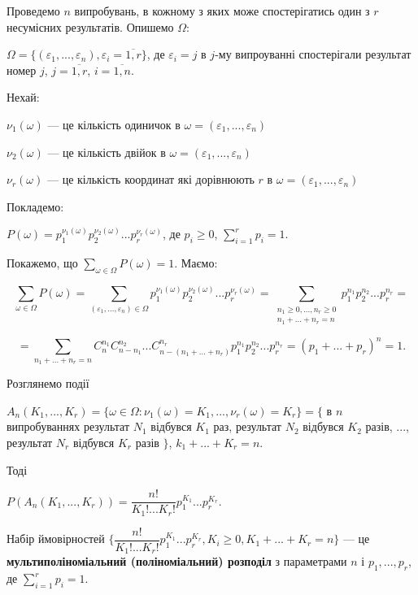 Проведемо $n$ випробувань, в кожному з яких може спостерігатись один з $r$ несумісних 
результатів. Опишемо $\Omega:$

$\Omega = \{(\varepsilon_1, ..., \varepsilon_n), \varepsilon_i = \overline{1,r}\}$,
де $\varepsilon_i = j$ в $j$-му випроуванні спостерігали результат номер $j$,
$j = \overline{1,r}$, $i = \overline{1, n}$.

Нехай:

$\nu_1(\omega)$ --- це кількість одиничок в $\omega = (\varepsilon_1, ..., \varepsilon_n)$

$\nu_2(\omega)$ --- це кількість двійок в $\omega = (\varepsilon_1, ..., \varepsilon_n)$

$\nu_r(\omega)$ --- це кількість координат які дорівнюють $r$ в $\omega = (\varepsilon_1, ..., \varepsilon_n)$

Покладемо: 

$P(\omega) = p_1^{\nu_1(\omega)}p_2^{\nu_2(\omega)}...p_r^{\nu_r(\omega)}$, де $p_i \geqslant 0$,
$\sum\limits_{i=1}^r p_i = 1$.

Покажемо, що $\sum\limits_{\omega \in \Omega} P(\omega) = 1$. Маємо: 

$$\sum\limits_{\omega \in \Omega} P(\omega)
= \sum\limits_{(\varepsilon_1, ..., \varepsilon_n) \in \Omega}
    p_1^{\nu_1(\omega)}p_2^{\nu_2(\omega)}...p_r^{\nu_r(\omega)}
= \sum\limits_{\begin{matrix}
        n_1 \geqslant 0, ..., n_r \geqslant 0\\
        n_1 + ... + n_r = n
    \end{matrix}} 
    p_1^{n_1} p_2^{n_2}...p_r^{n_r} = $$

$$= \sum\limits_{n_1 + ... + n_r = n} 
    C_n^{n_1} C_{n-n_1}^{n_2} ... C_{n-(n_1 + ... + n_r)}^{n_r} p_1^{n_1} p_2^{n_2}...p_r^{n_r}
= (p_1 + ... + p_r)^n = 1.$$

Розглянемо події

$A_n(K_1, ..., K_r) = \{\omega \in \Omega: \nu_1(\omega) = K_1, ..., \nu_r(\omega) = K_r\} = \{$
в $n$ випробуваннях результат $N_1$ відбувся $K_1$ раз, результат $N_2$ відбувся $K_2$ разів, ...,
результат $N_r$ відбувся $K_r$ разів $\}$, $k_1 + ... + K_r = n$.

Тоді

$P(A_n(K_1, ..., K_r)) = \dfrac{n!}{K_1!...K_r!} p_1^{K_1} ... p_r^{K_r}.$

\begin{definition}
    Набір ймовірностей $\{\dfrac{n!}{K_1!...K_r!} p_1^{K_1} ... p_r^{K_r}, K_i \geqslant 0, K_1 + ... + K_r = n\}$
    --- це \textbf{мультиполіноміальний (поліноміальний) розподіл} з параметрами $n$ і $p_1, ..., p_r$, де
    $\sum\limits_{i=1}^r p_i = 1.$
\end{definition}

